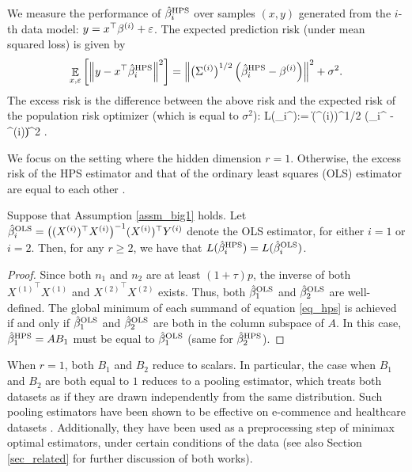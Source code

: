 We measure the performance of $\hat{\beta}_i^{\textup{HPS}}$ over samples $(x,y)$ generated from the $i$-th data model: $y= x^\top \beta^{(i)} + {\varepsilon}$.
The expected prediction risk (under mean squared loss) is given by
$$\mathop{\mathbb{E}}_{x, \varepsilon}\left[ \left\|y-x^\top \hat{\beta}_i^{\textup{HPS}} \right\|^2 \right]= \left\|\big(\Sigma^{(i)}\big)^{1/2} \left(\hat{\beta}_i^{\textup{HPS}} - \beta^{(i)}\right)\right\|^2 + \sigma^2.$$
The excess risk is the difference between the above risk and the expected risk of the population risk optimizer (which is equal to $\sigma^2$):
\be\label{HPS_loss}
    L(\hat{\beta}_i^{\MTL}):= \left\| \big(\Sigma^{(i)}\big)^{1/2} \left(\hat{\beta}_i^{\MTL} - \beta^{(i)}\right)\right\|^2 .
\ee

We focus on the setting where the hidden dimension $r = 1$.
Otherwise, the excess risk of the HPS estimator and that of the ordinary least squares (OLS) estimator are equal to each other \cite{WZR20}.
\begin{proposition}\label{prop_large_r}
    Suppose that Assumption \ref{assm_big1} holds.
    Let $\hat{\beta}_i^{\textup{OLS}} = \big( (X^{(i)})^{\top} X^{(i)} \big)^{-1} (X^{(i)})^{\top} Y^{(i)}$ denote the OLS estimator, for either $i = 1$ or $i = 2$.
    Then, for any $r \ge 2$, we have that $L(\hat{\beta}_i^{\textup{HPS}}) = L(\hat{\beta}_i^{\textup{OLS}})$.
\end{proposition}

\begin{proof}
    Since both $n_1$ and $n_2$ are at least $(1 + \tau) p$, the inverse of both ${X^{(1)}}^{\top} X^{(1)}$ and ${X^{(2)}}^{\top} X^{(2)}$ exists.
    Thus, both $\hat{\beta}_1^{\textup{OLS}}$ and $\hat{\beta}_2^{\textup{OLS}}$ are well-defined.
    The global minimum of each summand of equation \eqref{eq_hps} is achieved if and only if $\hat{\beta}_1^{\textup{OLS}}$ and $\hat{\beta}_2^{\textup{OLS}}$ are both in the column subspace of $A$.
    In this case, $\hat{\beta}_1^{\textup{HPS}} = A B_1$ must be equal to $\hat{\beta}_1^{\textup{OLS}}$ (same for $\hat{\beta}_2^{\textup{HPS}}$).
\end{proof}

When $r = 1$, both $B_1$ and $B_2$ reduce to scalars.
In particular, the case when $B_1$ and $B_2$ are both equal to $1$ reduces to a pooling estimator, which treats both datasets as if they are drawn independently from the same distribution.
Such pooling estimators have been shown to be effective on e-commence and healthcare datasets \cite{bastani2020predicting}.
Additionally, they have been used as a preprocessing step of minimax optimal estimators, under certain conditions of the data \cite{li2020transfer} (see also Section \ref{sec_related} for further discussion of both works).

